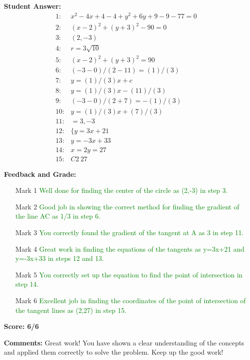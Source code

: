\documentclass{article}
\begin{document}
\textbf{Student Answer:}
\begin{align*}
1: & x^{2}-4x+4-4+y^{2}+6y+9-9-77=0 \\
2: & (x-2)^{2}+(y+3)^{2}-90=0 \\
3: & (2,-3) \\
4: & r=3\sqrt{10} \\
5: & (x-2)^{2}+(y+3)^{2}=90 \\
6: & (-3-0)/(2-11)=(1)/(3) \\
7: & y=(1)/(3)x+c \\
8: & y=(1)/(3)x-(11)/(3) \\
9: & (-3-0)/(2+7)=-(1)/(3) \\
10: & y=(1)/(3)x+(7)/(3) \\
11: & =3,-3 \\
12: & \{y=3x+21 \\
13: & y=-3x+33 \\
14: & x=2y=27 \\
15: & C2\ 27
\end{align*}

\textbf{Feedback and Grade:}
\begin{itemize}
\item[Mark 1] \textcolor{green}{Well done for finding the center of the circle as (2,-3) in step 3.}
\item[Mark 2] \textcolor{green}{Good job in showing the correct method for finding the gradient of the line AC as 1/3 in step 6.}
\item[Mark 3] \textcolor{green}{You correctly found the gradient of the tangent at A as 3 in step 11.}
\item[Mark 4] \textcolor{green}{Great work in finding the equations of the tangents as y=3x+21 and y=-3x+33 in steps 12 and 13.}
\item[Mark 5] \textcolor{green}{You correctly set up the equation to find the point of intersection in step 14.}
\item[Mark 6] \textcolor{green}{Excellent job in finding the coordinates of the point of intersection of the tangent lines as (2,27) in step 15.}
\end{itemize}

\textbf{Score: 6/6}

\textbf{Comments:} Great work! You have shown a clear understanding of the concepts and applied them correctly to solve the problem. Keep up the good work!
\end{document}
